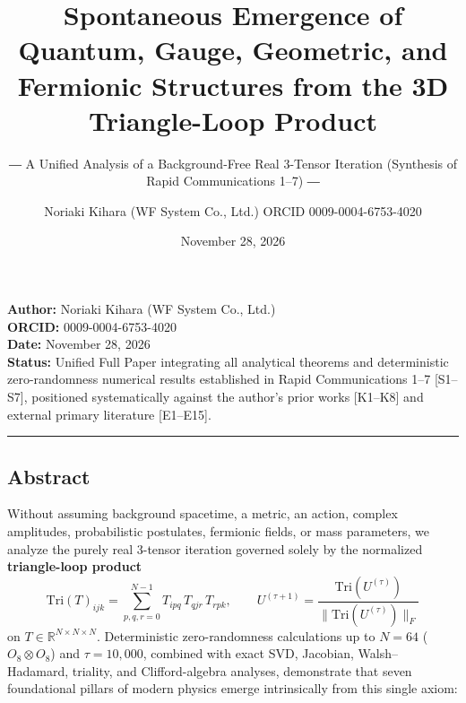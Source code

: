 \documentclass[
  a4paper,
]{article}
\title{Spontaneous Emergence of Quantum, Gauge, Geometric, and Fermionic
Structures from the 3D Triangle-Loop Product}
\subtitle{― A Unified Analysis of a Background-Free Real 3-Tensor
Iteration (Synthesis of Rapid Communications 1--7) ―}
\author{Noriaki Kihara (WF System Co., Ltd.) ORCID 0009-0004-6753-4020}
\date{November 28, 2026}
\begin{document}
\maketitle

{
\setcounter{tocdepth}{2}
\tableofcontents
}
\textbf{Author:} Noriaki Kihara (WF System Co., Ltd.)\\
\textbf{ORCID:} 0009-0004-6753-4020\\
\textbf{Date:} November 28, 2026\\
\textbf{Status:} Unified Full Paper integrating all analytical theorems
and deterministic zero-randomness numerical results established in Rapid
Communications 1--7 {[}S1--S7{]}, positioned systematically against the
author's prior works {[}K1--K8{]} and external primary literature
{[}E1--E15{]}.

\begin{center}\rule{0.5\linewidth}{0.5pt}\end{center}

\subsection{Abstract}\label{abstract}

Without assuming background spacetime, a metric, an action, complex
amplitudes, probabilistic postulates, fermionic fields, or mass
parameters, we analyze the purely real 3-tensor iteration governed
solely by the normalized \textbf{triangle-loop product}
\[\mathrm{Tri}(T)_{ijk} = \sum_{p,q,r=0}^{N-1} T_{ipq}\, T_{qjr}\, T_{rpk}, \qquad U^{(\tau+1)} = \frac{\mathrm{Tri}(U^{(\tau)})}{\|\mathrm{Tri}(U^{(\tau)})\|_F}\]
on \(T \in \mathbb{R}^{N\times N\times N}\). Deterministic
zero-randomness calculations up to \(N = 64\) (\(O_8 \otimes O_8\)) and
\(\tau = 10{,}000\), combined with exact SVD, Jacobian, Walsh--Hadamard,
triality, and Clifford-algebra analyses, demonstrate that seven
foundational pillars of modern physics emerge intrinsically from this
single axiom:
\end{document}
